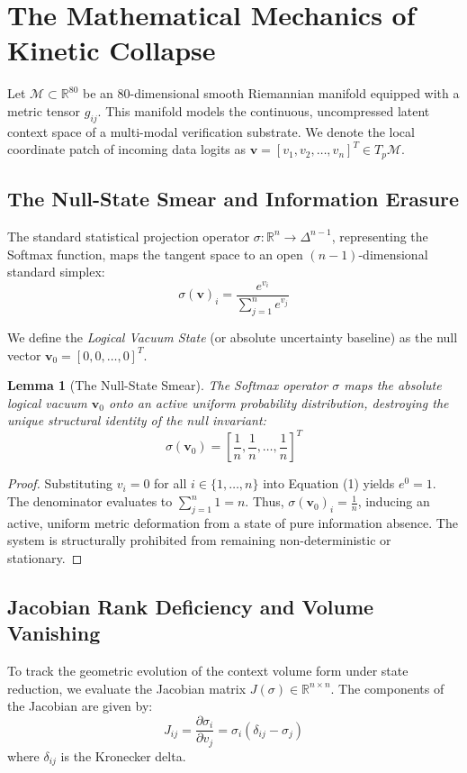\documentclass{article}
\newtheorem{lemma}{Lemma}
\newcommand{\M}{\mathcal{M}}
\newcommand{\R}{\mathbb{R}}
\begin{document}
\section{The Mathematical Mechanics of Kinetic Collapse}

Let $\M \subset \R^{80}$ be an $80$-dimensional smooth Riemannian manifold equipped with a metric tensor $g_{ij}$. This manifold models the continuous, uncompressed latent context space of a multi-modal verification substrate. We denote the local coordinate patch of incoming data logits as $\bm{v} = [v_1, v_2, \dots, v_n]^T \in T_p\M$.

\subsection{The Null-State Smear and Information Erasure}
The standard statistical projection operator $\sigma: \R^n \to \Delta^{n-1}$, representing the Softmax function, maps the tangent space to an open $(n-1)$-dimensional standard simplex:
\begin{equation}
    \sigma(\bm{v})_i = \frac{e^{v_i}}{\sum_{j=1}^n e^{v_j}}
\end{equation}

We define the \textit{Logical Vacuum State} (or absolute uncertainty baseline) as the null vector $\bm{v}_0 = [0, 0, \dots, 0]^T$. 

\begin{lemma}[The Null-State Smear]
The Softmax operator $\sigma$ maps the absolute logical vacuum $\bm{v}_0$ onto an active uniform probability distribution, destroying the unique structural identity of the null invariant:
\begin{equation}
    \sigma(\bm{v}_0) = \left[ \frac{1}{n}, \frac{1}{n}, \dots, \frac{1}{n} \right]^T
\end{equation}
\end{lemma}

\begin{proof}
Substituting $v_i = 0$ for all $i \in \{1, \dots, n\}$ into Equation (1) yields $e^0 = 1$. The denominator evaluates to $\sum_{j=1}^n 1 = n$. Thus, $\sigma(\bm{v}_0)_i = \frac{1}{n}$, inducing an active, uniform metric deformation from a state of pure information absence. The system is structurally prohibited from remaining non-deterministic or stationary.
\end{proof}

\subsection{Jacobian Rank Deficiency and Volume Vanishing}
To track the geometric evolution of the context volume form under state reduction, we evaluate the Jacobian matrix $J(\sigma) \in \R^{n \times n}$. The components of the Jacobian are given by:
\begin{equation}
    J_{ij} = \frac{\partial \sigma_i}{\partial v_j} = \sigma_i (\delta_{ij} - \sigma_j)
\end{equation}
where $\delta_{ij}$ is the Kronecker delta.
\end{document}
